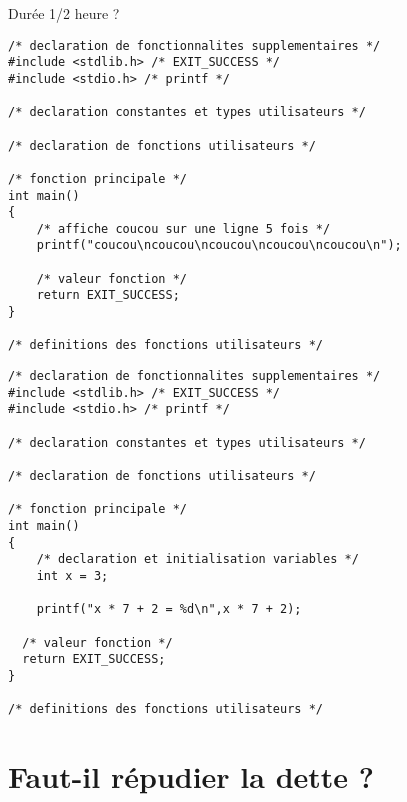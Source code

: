 \begin{correction}
Durée 1/2 heure ?

\begin{verbatim}
/* declaration de fonctionnalites supplementaires */
#include <stdlib.h> /* EXIT_SUCCESS */
#include <stdio.h> /* printf */

/* declaration constantes et types utilisateurs */

/* declaration de fonctions utilisateurs */

/* fonction principale */
int main()
{
    /* affiche coucou sur une ligne 5 fois */
    printf("coucou\ncoucou\ncoucou\ncoucou\ncoucou\n");
    
    /* valeur fonction */
    return EXIT_SUCCESS;
}

/* definitions des fonctions utilisateurs */

\end{verbatim}

\begin{verbatim}
/* declaration de fonctionnalites supplementaires */
#include <stdlib.h> /* EXIT_SUCCESS */
#include <stdio.h> /* printf */

/* declaration constantes et types utilisateurs */

/* declaration de fonctions utilisateurs */

/* fonction principale */
int main()
{
    /* declaration et initialisation variables */
    int x = 3;

    printf("x * 7 + 2 = %d\n",x * 7 + 2);

  /* valeur fonction */
  return EXIT_SUCCESS;
}

/* definitions des fonctions utilisateurs */
\end{verbatim}
\end{correction}

\section{Faut-il répudier la dette ?}

